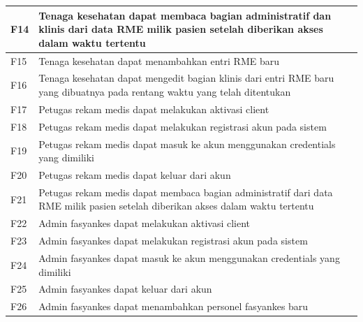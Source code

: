 \documentclass[bahasa, 12pt, a4paper, onecolumn, oneside, final]{report}
\begin{document}
\begin{longtable}{|p{0.8cm}|p{11.5cm}|}
	F14         & Tenaga kesehatan dapat membaca bagian administratif dan klinis dari data RME milik pasien setelah diberikan akses dalam waktu tertentu         \\ \hline
	F15         & Tenaga kesehatan dapat menambahkan entri RME baru                                                                                              \\ \hline
	F16         & Tenaga kesehatan dapat mengedit bagian klinis dari entri RME baru yang dibuatnya pada rentang waktu yang telah ditentukan                      \\ \hline
	F17         & Petugas rekam medis dapat melakukan aktivasi client                                                                                            \\ \hline
	F18         & Petugas rekam medis dapat melakukan registrasi akun pada sistem                                                                                \\ \hline
	F19         & Petugas rekam medis dapat masuk ke akun menggunakan credentials yang dimiliki                                                                  \\ \hline
	F20         & Petugas rekam medis dapat keluar dari akun                                                                                                     \\ \hline
	F21         & Petugas rekam medis dapat membaca bagian administratif dari data RME milik pasien setelah diberikan akses dalam waktu tertentu                 \\ \hline
	F22         & Admin fasyankes dapat melakukan aktivasi client                                                                                                \\ \hline
	F23         & Admin fasyankes dapat melakukan registrasi akun pada sistem                                                                                    \\ \hline
	F24         & Admin fasyankes dapat masuk ke akun menggunakan credentials yang dimiliki                                                                      \\ \hline
	F25         & Admin fasyankes dapat keluar dari akun                                                                                                         \\ \hline
	F26         & Admin fasyankes dapat menambahkan personel fasyankes baru                                                                                      \\ \hline

\end{longtable}
\end{document}
